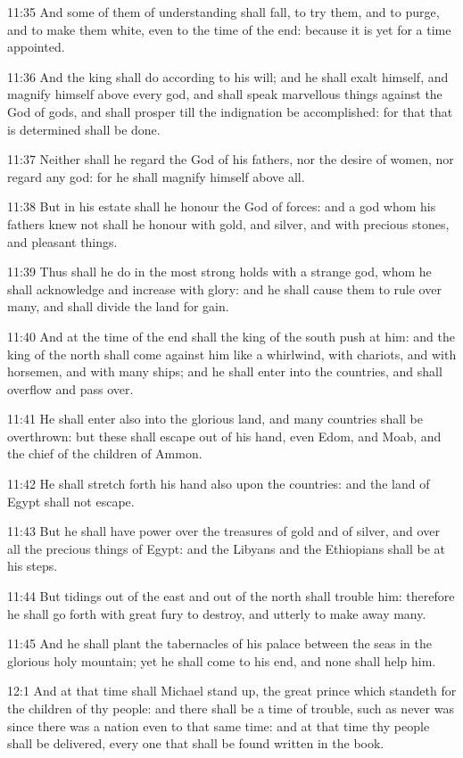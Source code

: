 11:35 And some of them of understanding shall fall, to try them, and to purge, and to make them white, even to the time of the end: because it is yet for a time appointed.

11:36 And the king shall do according to his will; and he shall exalt himself, and magnify himself above every god, and shall speak marvellous things against the God of gods, and shall prosper till the indignation be accomplished: for that that is determined shall be done.

11:37 Neither shall he regard the God of his fathers, nor the desire of women, nor regard any god: for he shall magnify himself above all.

11:38 But in his estate shall he honour the God of forces: and a god whom his fathers knew not shall he honour with gold, and silver, and with precious stones, and pleasant things.

11:39 Thus shall he do in the most strong holds with a strange god, whom he shall acknowledge and increase with glory: and he shall cause them to rule over many, and shall divide the land for gain.

11:40 And at the time of the end shall the king of the south push at him: and the king of the north shall come against him like a whirlwind, with chariots, and with horsemen, and with many ships; and he shall enter into the countries, and shall overflow and pass over.

11:41 He shall enter also into the glorious land, and many countries shall be overthrown: but these shall escape out of his hand, even Edom, and Moab, and the chief of the children of Ammon.

11:42 He shall stretch forth his hand also upon the countries: and the land of Egypt shall not escape.

11:43 But he shall have power over the treasures of gold and of silver, and over all the precious things of Egypt: and the Libyans and the Ethiopians shall be at his steps.

11:44 But tidings out of the east and out of the north shall trouble him: therefore he shall go forth with great fury to destroy, and utterly to make away many.

11:45 And he shall plant the tabernacles of his palace between the seas in the glorious holy mountain; yet he shall come to his end, and none shall help him.

12:1 And at that time shall Michael stand up, the great prince which standeth for the children of thy people: and there shall be a time of trouble, such as never was since there was a nation even to that same time: and at that time thy people shall be delivered, every one that shall be found written in the book.

